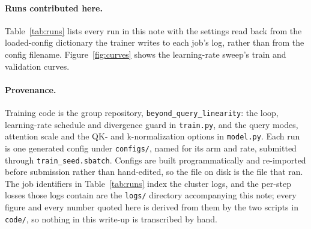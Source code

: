 \documentclass[mlabstract,onecolumn]{jmlr}
\begin{document}
\paragraph{Runs contributed here.} Table~\ref{tab:runs} lists every run in this note with
the settings read back from the loaded-config dictionary the trainer writes to each job's
log, rather than from the config filename. Figure~\ref{fig:curves} shows the learning-rate
sweep's train and validation curves.

\paragraph{Provenance.} Training code is the group repository,
\texttt{beyond\_query\_linearity}: the loop, learning-rate schedule and divergence guard in
\texttt{train.py}, and the query modes, attention scale and the QK- and k-normalization
options in \texttt{model.py}. Each run is one generated config under \texttt{configs/},
named for its arm and rate, submitted through \texttt{train\_seed.sbatch}. Configs are built
programmatically and re-imported before submission rather than hand-edited, so the file on
disk is the file that ran. The job identifiers in Table~\ref{tab:runs} index the cluster
logs, and the per-step losses those logs contain are the \texttt{logs/} directory
accompanying this note; every figure and every number quoted here is derived from them by
the two scripts in \texttt{code/}, so nothing in this write-up is transcribed by hand.
\end{document}
